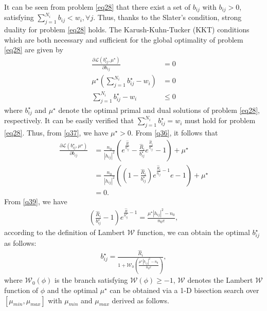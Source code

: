 \documentclass[journal]{IEEEtran}
\begin{document}
It can be seen from problem \eqref{eq28} that there exist a set of $b_{ij}$ with $b_{ij} > 0$, satisfying $\sum\limits_{j = 1}^{N_i} b_{ij} < w_i, \forall j$. Thus, thanks to the Slater's condition, strong duality for problem \eqref{eq28} holds. The Karush-Kuhn-Tucker (KKT) conditions which are both necessary and 	sufficient for the  global optimality of problem \eqref{eq28} are given by
\begin{align}
\frac{\partial \mathcal{L}\left({b_{ij}^\star}, \mu^\star\right)}{\partial b_{ij}} &= 0 \label{q36} \\
\mu^\star\left(\sum\limits_{j = 1}^{N_i}b_{ij}^\star - w_i\right) &= 0 \label{q37} \\
\sum\limits_{j = 1}^{N_i}b_{ij}^\star - w_i & \leq 0 \label{q38}
\end{align} 
where $b_{ij}^\star$ and $\mu^\star$ denote the optimal primal and dual solutions of problem \eqref{eq28}, respectively. It can be easily verified that $\sum\limits_{j = 1}^{N_i} b_{ij}^\star = w_i$ must hold for problem \eqref{eq28}. Thus, from \eqref{q37}, we have $\mu^\star > 0$. From \eqref{q36}, it follows that 
\begin{align}
\frac{\partial \mathcal{L} \left(b_{ij}^\star, \mu^\star \right)}{\partial b_{ij}} &= \frac{n_0}{\left|h_{ij}\right|^2} \left(e^{\frac{\hat{R}}{b_{ij}^\star}} -  \frac{\hat{R}_i}{b_{ij}^\star} e^{\frac{\hat{R}_i}{b_{ij}^\star}} - 1\right) + \mu^\star \nonumber \\
& =  \frac{n_0}{\left|h_{ij}\right|^2}\left(\left(1 - \frac{\hat{R}_i}{b_{ij}^\star}\right)e^{\frac{\hat{R}_i}{b_{ij}^\star} - 1}e - 1\right) + \mu^\star \nonumber \\
& = 0. \label{q39}
\end{align}
From \eqref{q39}, we have
\begin{align}
\left(\frac{\hat{R}_i}{b_{ij}^\star} - 1\right) e^{\frac{\hat{R}}{b_{ij}^\star} - 1} = \frac{\mu^\star \left|h_{ij}\right|^2 - n_0}{n_0 e},
\end{align}
according to the definition of Lambert $\mathcal{W}$ function, we can obtain the optimal $b_{ij}^\star$ as follows:
\begin{align}
b_{ij}^\star = \frac{\hat{R}_i}{1 + \mathcal{W}_0\left(\frac{\mu^\star \left|h_{ij}\right|^2 - n_0}{n_0 e}\right)} \label{q41},
\end{align}
where $\mathcal{W}_0\left(\phi\right)$ is the branch satisfying $\mathcal{W}\left(\phi\right) \geq -1$, $\mathcal{W}$ denotes the Lambert $\mathcal{W}$ function of $\phi$ \cite{RMCorless} and the optimal $\mu^\star$ can be obtained via a 1-D bisection search over $\left[\mu_{min}, \mu_{max}\right]$ with $\mu_{min} $ and $\mu_{max}$ derived as follows.
\end{document}
